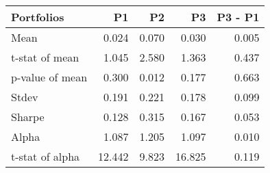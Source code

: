 \begin{tabular}{lrrrr}
\toprule
Portfolios & P1 & P2 & P3 & P3 - P1 \\
\midrule
Mean & 0.024 & 0.070 & 0.030 & 0.005 \\
t-stat of mean & 1.045 & 2.580 & 1.363 & 0.437 \\
p-value of mean & 0.300 & 0.012 & 0.177 & 0.663 \\
Stdev & 0.191 & 0.221 & 0.178 & 0.099 \\
Sharpe & 0.128 & 0.315 & 0.167 & 0.053 \\
Alpha & 1.087 & 1.205 & 1.097 & 0.010 \\
t-stat of alpha & 12.442 & 9.823 & 16.825 & 0.119 \\
\bottomrule
\end{tabular}
